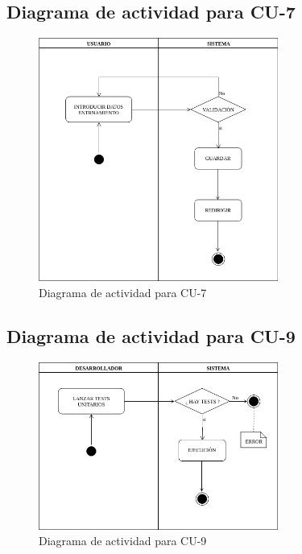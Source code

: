 \subsection{Diagrama de actividad para CU-7 }
\begin{figure}[H]
  \begin{center}
    \includegraphics[width=0.7\textwidth]{imagenes/DA-CU-7.png}
    \caption{Diagrama de actividad para CU-7}
    \label{fig:DA-CU-7}
  \end{center}
\end{figure}
\subsection{Diagrama de actividad para CU-9 }
\begin{figure}[H]
  \begin{center}
    \includegraphics[width=0.7\textwidth]{imagenes/DA-CU-9.png}
    \caption{Diagrama de actividad para CU-9}
    \label{fig:DA-CU-9}
  \end{center}
\end{figure}
